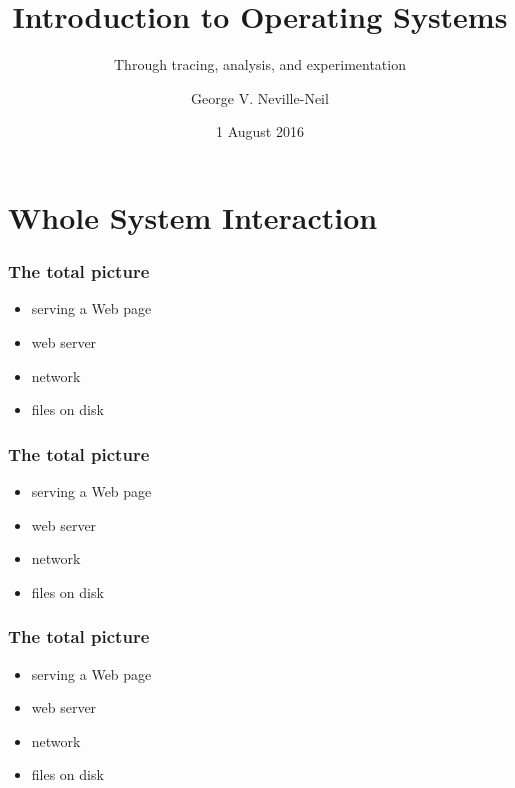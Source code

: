 
\usepackage[english]{babel}
\usepackage[latin1]{inputenc}
\usepackage{graphicx}
\usepackage{times}
\usepackage[T1]{fontenc}
\usepackage{fancyvrb}
\usepackage{listings}


\title{Introduction to Operating Systems}
\subtitle{Through tracing, analysis, and experimentation}
\author{George V. Neville-Neil}
\date{1 August 2016}

\begin{frame}
  \titlepage
\end{frame}

\section{Whole System Interaction}
\label{sec:whole}

\begin{frame}
  \frametitle{The total picture}
  \begin{itemize}
  \item serving a Web page
  \item web server
  \item network 
  \item files on disk
  \end{itemize}
\end{frame}

\begin{frame}
  \frametitle{The total picture}
  \begin{itemize}
  \item serving a Web page
  \item web server
  \item network 
  \item files on disk
  \end{itemize}
\end{frame}

\begin{frame}
  \frametitle{The total picture}
  \begin{itemize}
  \item serving a Web page
  \item web server
  \item network 
  \item files on disk
  \end{itemize}
\end{frame}

